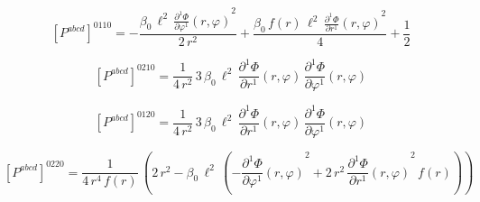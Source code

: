 \documentclass[11pt]{article}
\begin{document}
\par\smallskip
\begin{dmath*}[breakdepth={5}]
\left[P^{abcd}\right]^{0110} = -\frac{\beta_{0}\,{\ell}^{2}\,{\frac{\partial^{1} \Phi}{\partial \varphi^{1}}\!\left(r, \varphi\right)}^{2}}{2\,{r}^{2}} + \frac{\beta_{0}\,f\!\left(r\right)\,{\ell}^{2}\,{\frac{\partial^{1} \Phi}{\partial r^{1}}\!\left(r, \varphi\right)}^{2}}{4} + \frac{1}{2}
\end{dmath*}
\par\smallskip
\begin{dmath*}[breakdepth={5}]
\left[P^{abcd}\right]^{0210} = \frac{1}{4\,{r}^{2}}\,3\,\beta_{0}\,{\ell}^{2}\,\frac{\partial^{1} \Phi}{\partial r^{1}}\!\left(r, \varphi\right)\,\frac{\partial^{1} \Phi}{\partial \varphi^{1}}\!\left(r, \varphi\right)
\end{dmath*}
\par\smallskip
\begin{dmath*}[breakdepth={5}]
\left[P^{abcd}\right]^{0120} = \frac{1}{4\,{r}^{2}}\,3\,\beta_{0}\,{\ell}^{2}\,\frac{\partial^{1} \Phi}{\partial r^{1}}\!\left(r, \varphi\right)\,\frac{\partial^{1} \Phi}{\partial \varphi^{1}}\!\left(r, \varphi\right)
\end{dmath*}
\par\smallskip
\begin{dmath*}[breakdepth={5}]
\left[P^{abcd}\right]^{0220} = \frac{1}{4\,{r}^{4}\,f\!\left(r\right)}\,\left(2\,{r}^{2} - \beta_{0}\,{\ell}^{2}\,\left(-{\frac{\partial^{1} \Phi}{\partial \varphi^{1}}\!\left(r, \varphi\right)}^{2} + 2\,{r}^{2}\,{\frac{\partial^{1} \Phi}{\partial r^{1}}\!\left(r, \varphi\right)}^{2}\,f\!\left(r\right)\right)\right)
\end{dmath*}
\par\smallskip
\end{document}
